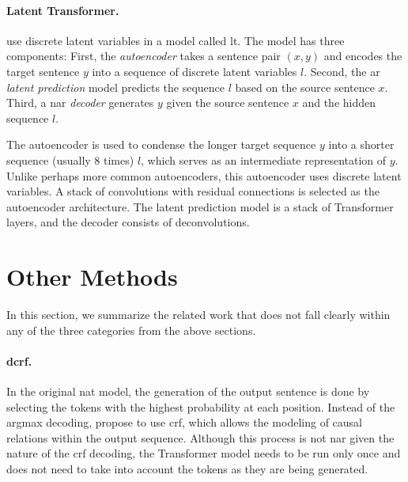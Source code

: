 \paragraph{Latent Transformer.} \citet{kaiser2018fast} use discrete latent
variables in a model called \acf{lt}. The model has three
components: First, the \emph{autoencoder} takes a sentence pair $(x, y)$ and
encodes the target sentence $y$ into a sequence of discrete latent variables
$l$. Second, the \acl{ar} \emph{latent prediction} model predicts the sequence
$l$ based on the source sentence $x$. Third, a \acl{nar} \emph{decoder}
generates $y$ given the source sentence $x$ and the hidden sequence $l$.

The autoencoder is used to condense the longer target sequence $y$ into a
shorter sequence (usually 8 times) $l$, which serves as an intermediate
representation of $y$. Unlike perhaps more common autoencoders, this
autoencoder uses discrete latent variables.
A stack of convolutions with residual connections is selected as the
autoencoder architecture. The latent prediction model is a stack of Transformer
layers, and the decoder consists of deconvolutions.
%


\section{Other Methods}%
\label{sec:nat:misc}

In this section, we summarize the related work that does not fall clearly
within any of the three categories from the above sections.


\paragraph{\Acl{dcrf}.} %
In the original \ac{nat} model, the generation of the output sentence is done
by selecting the tokens with the highest probability at each position. Instead
of the argmax decoding, \citet{sun2019fast} propose to use \ac{crf}, which
allows the modeling of causal relations within the output sequence. Although
this process is not \acl{nar} given the nature of the \ac{crf} decoding, the
Transformer model needs to be run only once and does not need to take into
account the tokens as they are being generated.

